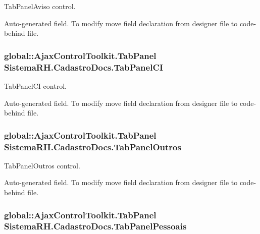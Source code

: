 TabPanelAviso control. 

Auto-\/generated field. To modify move field declaration from designer file to code-\/behind file. \hypertarget{class_sistema_r_h_1_1_cadastro_docs_af60edc8050fb84b1efce0e996bd0232d}{
\subsubsection[{TabPanelCI}]{\setlength{\rightskip}{0pt plus 5cm}global::AjaxControlToolkit.TabPanel {\bf SistemaRH.CadastroDocs.TabPanelCI}}}
\label{class_sistema_r_h_1_1_cadastro_docs_af60edc8050fb84b1efce0e996bd0232d}


TabPanelCI control. 

Auto-\/generated field. To modify move field declaration from designer file to code-\/behind file. \hypertarget{class_sistema_r_h_1_1_cadastro_docs_a43cf515093ff1a25c3eeaf873103cd14}{
\subsubsection[{TabPanelOutros}]{\setlength{\rightskip}{0pt plus 5cm}global::AjaxControlToolkit.TabPanel {\bf SistemaRH.CadastroDocs.TabPanelOutros}}}
\label{class_sistema_r_h_1_1_cadastro_docs_a43cf515093ff1a25c3eeaf873103cd14}


TabPanelOutros control. 

Auto-\/generated field. To modify move field declaration from designer file to code-\/behind file. \hypertarget{class_sistema_r_h_1_1_cadastro_docs_af70eb4a83950527be5018dbfbef36fcc}{
\subsubsection[{TabPanelPessoais}]{\setlength{\rightskip}{0pt plus 5cm}global::AjaxControlToolkit.TabPanel {\bf SistemaRH.CadastroDocs.TabPanelPessoais}}}
\label{class_sistema_r_h_1_1_cadastro_docs_af70eb4a83950527be5018dbfbef36fcc}



